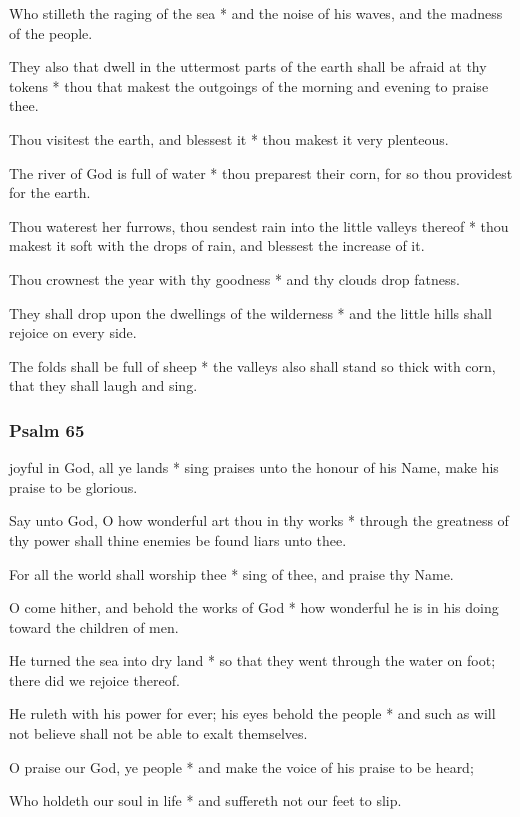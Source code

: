 Who stilleth the raging of the sea * and the noise of his waves, and the madness of the people.

They also that dwell in the uttermost parts of the earth shall be afraid at thy tokens * thou that makest the outgoings of the morning and evening to praise thee.

Thou visitest the earth, and blessest it * thou makest it very plenteous.

The river of God is full of water * thou preparest their corn, for so thou providest for the earth.

Thou waterest her furrows, thou sendest rain into the little valleys thereof * thou makest it soft with the drops of rain, and blessest the increase of it.

Thou crownest the year with thy goodness * and thy clouds drop fatness.

They shall drop upon the dwellings of the wilderness * and the little hills shall rejoice on every side.

The folds shall be full of sheep * the valleys also shall stand so thick with corn, that they shall laugh and sing.

\subsubsection{Psalm 65}


 joyful in God, all ye lands * sing praises unto the honour of his Name, make his praise to be glorious.

Say unto God, O how wonderful art thou in thy works * through the greatness of thy power shall thine enemies be found liars unto thee.

For all the world shall worship thee * sing of thee, and praise thy Name.

O come hither, and behold the works of God * how wonderful he is in his doing toward the children of men.

He turned the sea into dry land * so that they went through the water on foot; there did we rejoice thereof.

He ruleth with his power for ever; his eyes behold the people * and such as will not believe shall not be able to exalt themselves.

O praise our God, ye people * and make the voice of his praise to be heard;

Who holdeth our soul in life * and suffereth not our feet to slip.


